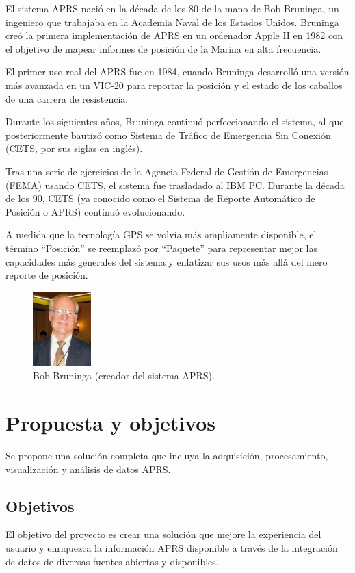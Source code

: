 El sistema APRS nació en la década de los 80 de la mano de Bob Bruninga, un ingeniero que trabajaba en la Academia Naval de los Estados Unidos. Bruninga creó la primera implementación de APRS en un ordenador Apple II en 1982 con el objetivo de mapear informes de posición de la Marina en alta frecuencia. \cite{APRSOrigins}

El primer uso real del APRS fue en 1984, cuando Bruninga desarrolló una versión más avanzada en un VIC-20 para reportar la posición y el estado de los caballos de una carrera de resistencia.

Durante los siguientes años, Bruninga continuó perfeccionando el sistema, al que posteriormente bautizó como Sistema de Tráfico de Emergencia Sin Conexión (CETS, por sus siglas en inglés).

Tras una serie de ejercicios de la Agencia Federal de Gestión de Emergencias (FEMA) usando CETS, el sistema fue trasladado al IBM PC. Durante la década de los 90, CETS (ya conocido como el Sistema de Reporte Automático de Posición o APRS) continuó evolucionando.

A medida que la tecnología GPS se volvía más ampliamente disponible, el término ``Posición'' se reemplazó por ``Paquete'' para representar mejor las capacidades más generales del sistema y enfatizar sus usos más allá del mero reporte de posición.

\begin{figure}[h]
	\centering
	\includegraphics[width=0.2\textwidth]{Imagenes/Chapter_1/bob_bruninga.png}
	\caption{Bob Bruninga (creador del sistema APRS).}
	\label{fig:bob-bruninga-es}
\end{figure}


\section{Propuesta y objetivos}
Se propone una solución completa que incluya la adquisición, procesamiento, visualización y análisis de datos APRS. 

\subsection{Objetivos}
El objetivo del proyecto es crear una solución que mejore la experiencia del usuario y enriquezca la información APRS disponible a través de la integración de datos de diversas fuentes abiertas y disponibles.

